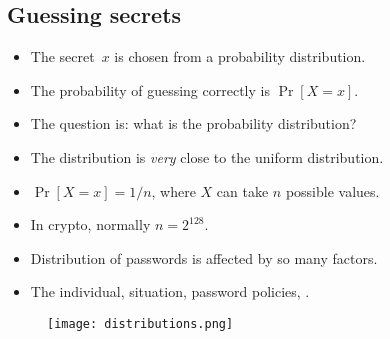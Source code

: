 \subsection{Guessing secrets}

\begin{frame}
  \begin{idea}
    \begin{itemize}
      \item The secret~\(x\) is chosen from a probability distribution.
      \item The probability of guessing correctly is \(\Pr[X = x]\).
    \end{itemize}
  \end{idea}

  \begin{remark}
    \begin{itemize}
      \item The question is: what is the probability distribution?
    \end{itemize}
  \end{remark}
\end{frame}

\begin{frame}
  \begin{example}
    \begin{itemize}
      \item The distribution is \emph{very} close to the uniform distribution.
      \item \Ie \(\Pr[X = x] = 1/n\), where \(X\) can take \(n\) possible 
        values.
      \item In crypto, normally \(n = 2^{128}\).
    \end{itemize}
  \end{example}

  \pause

  \begin{example}[Password]
    \begin{itemize}
      \item Distribution of passwords is affected by so many factors.
      \item The individual, situation, password policies, \etc.
    \end{itemize}
  \end{example}
\end{frame}

\begin{frame}
  \begin{figure}
    \texttt{[image: distributions.png]}
  \end{figure}
\end{frame}

